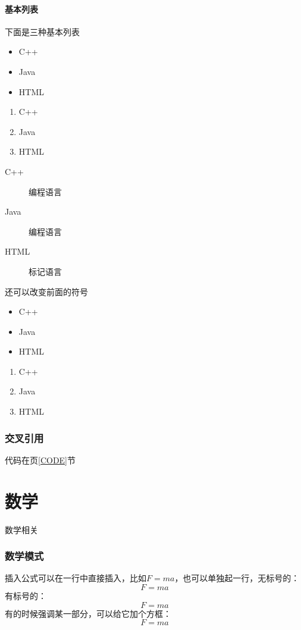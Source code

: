 \documentclass{article}
\begin{document}
			\subsection{基本列表}
			下面是三种基本列表
			\begin{itemize}
				\item C++
				\item Java
				\item HTML
			\end{itemize}
			\begin{enumerate}
				\item C++
				\item Java
				\item HTML
			\end{enumerate}
			\begin{description}
				\item[C++] 编程语言
				\item[Java] 编程语言
				\item[HTML] 标记语言
			\end{description}
			还可以改变前面的符号
			\renewcommand{\labelitemi}{-}
			\renewcommand{\theenumi}{\alph{enumi}}
			\begin{itemize}
				\item C++
				\item Java
				\item HTML
			\end{itemize}
			\begin{enumerate}
				\item C++
				\item Java
				\item HTML
			\end{enumerate}
		\section{交叉引用}
		代码在\pageref{CODE}页\ref{CODE}节
	\part{数学}
	数学相关
		\section{数学模式}
		插入公式可以在一行中直接插入，比如$F=ma$，也可以单独起一行，无标号的：
		\[ F=ma \]
		有标号的：
		\begin{equation}
			F=ma
		\end{equation}
		有的时候强调某一部分，可以给它加个方框：
		\[  F=m\boxed{a} \]
\end{document}
